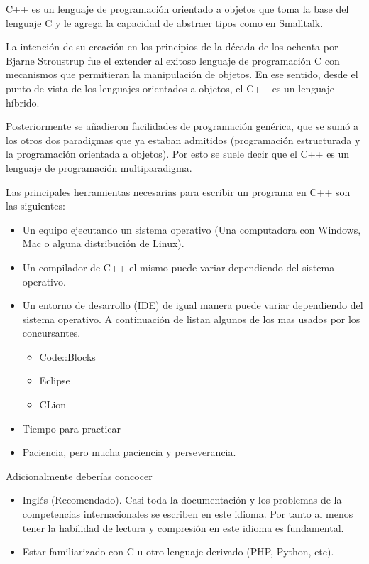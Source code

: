 C++ es un lenguaje de programación orientado a objetos que toma la base del lenguaje C y le agrega
 la capacidad de abstraer tipos como en Smalltalk.

La intención de su creación en los principios de la década de los ochenta por Bjarne Stroustrup fue el extender al exitoso lenguaje de programación C con mecanismos
que permitieran la manipulación de objetos. En ese sentido, desde el punto de vista de los lenguajes
orientados a objetos, el C++ es un lenguaje híbrido.

Posteriormente se añadieron facilidades de programación genérica, que se sumó a los otros dos
paradigmas que ya estaban admitidos (programación estructurada y la programación orientada a
objetos). Por esto se suele decir que el C++ es un lenguaje de programación multiparadigma.

Las principales herramientas necesarias para escribir un programa en C++ son las siguientes:

\begin{itemize}
	\item Un equipo ejecutando un sistema operativo (Una computadora con Windows, Mac o alguna distribución de Linux).
	\item Un compilador de C++ el mismo puede variar dependiendo del sistema operativo.
	\item Un entorno de desarrollo (IDE) de igual manera puede variar dependiendo del sistema operativo. A continuación de listan algunos de los mas usados por los concursantes.
	\begin{itemize}
		\item Code::Blocks 
		\item Eclipse
		\item CLion
	\end{itemize}
	\item Tiempo para practicar 
	\item Paciencia, pero mucha paciencia y perseverancia.
\end{itemize}

Adicionalmente deberías concocer

\begin{itemize}
	\item Inglés (Recomendado). Casi toda la documentación y los problemas de la competencias internacionales se escriben en este idioma. Por tanto al menos tener la habilidad de lectura y compresión en este idioma es fundamental.
	\item Estar familiarizado con C u otro lenguaje derivado (PHP, Python, etc).
\end{itemize}

